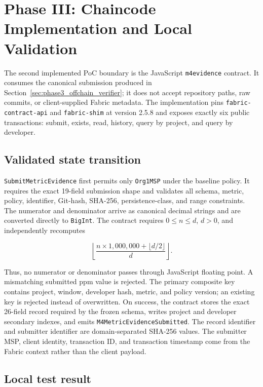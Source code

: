\section{Phase III: Chaincode Implementation and Local Validation}
\label{sec:phase3_chaincode_unit}

The second implemented PoC boundary is the JavaScript \texttt{m4evidence} contract. It consumes the canonical submission
produced in Section~\ref{sec:phase3_offchain_verifier}; it does not accept repository paths, raw commits, or client-supplied
Fabric metadata. The implementation pins \texttt{fabric-contract-api} and \texttt{fabric-shim} at version 2.5.8 and exposes
exactly six public transactions: submit, exists, read, history, query by project, and query by developer.

\subsection{Validated state transition}
\label{sec:phase3_chaincode_transition}

\texttt{SubmitMetricEvidence} first permits only \texttt{Org1MSP} under the baseline policy. It requires the exact 19-field
submission shape and validates all schema, metric, policy, identifier, Git-hash, SHA-256, persistence-class, and range
constraints. The numerator and denominator arrive as canonical decimal strings and are converted directly to
\texttt{BigInt}. The contract requires $0\leq n\leq d$, $d>0$, and independently recomputes

\[
\left\lfloor\frac{n\times1{,}000{,}000+\lfloor d/2\rfloor}{d}\right\rfloor.
\]

Thus, no numerator or denominator passes through JavaScript floating point. A mismatching submitted ppm value is rejected.
The primary composite key contains project, window, developer hash, metric, and policy version; an existing key is rejected
instead of overwritten. On success, the contract stores the exact 26-field record required by the frozen schema, writes
project and developer secondary indexes, and emits \texttt{M4MetricEvidenceSubmitted}. The record identifier and submitter
identifier are domain-separated SHA-256 values. The submitter MSP, client identity, transaction ID, and transaction timestamp
come from the Fabric context rather than the client payload.

\subsection{Local test result}
\label{sec:phase3_chaincode_tests}

